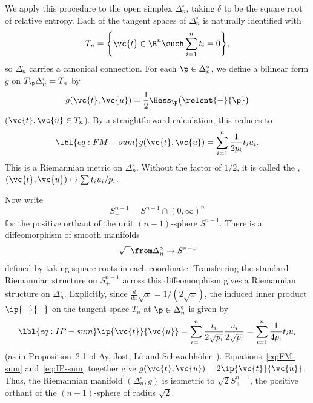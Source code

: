 We apply this procedure to the open simplex $\Delta_n^\circ$, taking
$\delta$ to be the square root of relative entropy.  Each of the tangent
spaces of $\Delta_n^\circ$ is naturally identified with
\[
T_n = \Biggl\{ \vc{t} \in \R^n \such \sum_{i = 1}^n t_i = 0 \Biggr\},
\]
so $\Delta_n^\circ$ carries a canonical connection.  For each $\p \in
\Delta_n^\circ$, we define a bilinear form $g$ on $T_\p \Delta_n^\circ =
T_n$ by
\[
g(\vc{t}, \vc{u})
=
\frac{1}{2}
\Hess_\p \bigl( \relent{-}{\p} \bigr)
\]
($\vc{t}, \vc{u} \in T_n$).  By a straightforward calculation, this reduces
to 
% 
\begin{equation}
\lbl{eq:FM-sum}
g(\vc{t}, \vc{u})
=
\sum_{i = 1}^n \frac{1}{2p_i} t_i u_i.
\end{equation}
% 
This is a Riemannian%
%
%
metric on $\Delta_n^\circ$.  Without the factor of $1/2$, it is called the
, $(\vc{t}, \vc{u}) \mapsto \sum t_i u_i/p_i$.

Now write
\[
S^{n - 1}_+ 
= 
S^{n - 1} \cap (0, \infty)^n
\]
for the positive orthant of the unit $(n - 1)$-sphere $S^{n - 1}$. 
There is a diffeomorphism of smooth manifolds
\[
\sqrt{\phantom{x}} \from \Delta_n^\circ \to S^{n - 1}_+
\]
defined by taking square roots in each coordinate.  Transferring the
standard Riemannian structure on $S^{n - 1}_+$ across this diffeomorphism
gives a Riemannian structure on $\Delta_n^\circ$.  Explicitly, since
$\tfrac{d}{dx}\sqrt{x} = 1/(2\sqrt{x})$, the induced
inner product $\ip{-}{-}$ on the tangent space $T_n$ at $\p \in
\Delta_n^\circ$ is given by
% 
\begin{equation}
\lbl{eq:IP-sum}
\ip{\vc{t}}{\vc{u}} 
= 
\sum_{i = 1}^n \frac{t_i}{2\sqrt{p_i}} \frac{u_i}{2\sqrt{p_i}}
=
\sum_{i = 1}^n \frac{1}{4p_i} t_i u_i
\end{equation}
% 
(as in Proposition~2.1 of Ay, Jost, L\^{e} and Schwachh\"ofer~\cite{AJLS}).
Equations~\eqref{eq:FM-sum} and~\eqref{eq:IP-sum} together give
$g(\vc{t}, \vc{u}) = 2\ip{\vc{t}}{\vc{u}}$.  Thus, the Riemannian manifold
$(\Delta_n^\circ, g)$ is isometric to $\sqrt{2}S^{n - 1}_+$, the positive
orthant of the $(n - 1)$-sphere of radius $\sqrt{2}$.

